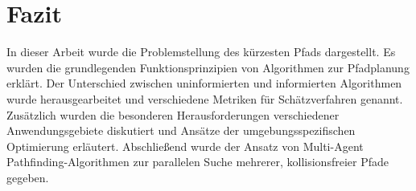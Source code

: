 \chapter{Fazit}

In dieser Arbeit wurde die Problemstellung des kürzesten Pfads dargestellt. Es wurden die grundlegenden Funktionsprinzipien von Algorithmen zur Pfadplanung erklärt. Der Unterschied zwischen uninformierten und informierten Algorithmen wurde herausgearbeitet und verschiedene Metriken für Schätzverfahren genannt. Zusätzlich wurden die besonderen Herausforderungen verschiedener Anwendungsgebiete diskutiert und Ansätze der umgebungsspezifischen Optimierung erläutert. Abschließend wurde der Ansatz von Multi-Agent Pathfinding-Algorithmen zur parallelen Suche mehrerer, kollisionsfreier Pfade gegeben.